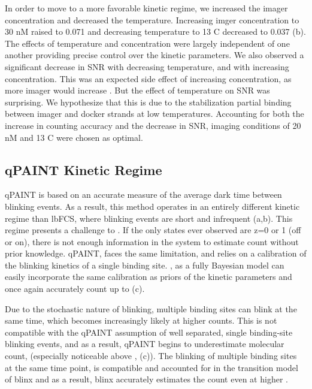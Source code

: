 In order to move to a more favorable kinetic regime, 
we increased the imager concentration and decreased the temperature.
	Increasing imger concentration to 30 nM raised \pon to 0.071 and 
	decreasing temperature to 13 C decreased \poff to 0.037 
	(b).
	The effects of temperature and concentration were largely independent 
	of one another providing precise control over the kinetic parameters. %
	We also observed a significant decrease in SNR with decreasing temperature, 
	and with increasing concentration. 
	This was an expected side effect of increasing concentration, as more imager would increase \rb.
	But the effect of temperature on SNR was surprising. 
	We hypothesize that this is due to the stabilization partial 
	binding between imager and docker strands at low temperatures.
	Accounting for both the increase in counting accuracy and the decrease 
	in SNR, imaging conditions of 20 nM and 13 C were chosen as optimal.

\subsection{qPAINT Kinetic Regime}
qPAINT is based on an accurate measure of the average dark time between blinking events. 
	As a result, this method operates in an entirely different kinetic regime than lbFCS, where blinking 
	events are short and infrequent (a,b).
	This regime presents a challenge to \ours. 
	If the only states ever observed are z=0 or 1 (off or on), there is not enough information in the system to estimate count without prior knowledge.
	qPAINT, faces the same limitation, and relies on a calibration of the blinking kinetics of a single binding site.
	\ours, as a fully Bayesian model can easily incorporate the same calibration as priors of the kinetic parameters
	and once again accurately count up to  (c).

Due to the stochastic nature of blinking, multiple binding sites can blink at the same time, which becomes increasingly likely at higher counts.
	This is not compatible with the qPAINT assumption of well separated, single binding-site blinking events, 
	and as a result, qPAINT begins to underestimate molecular count, (especially noticeable above , (c)). 
	The blinking of multiple binding sites at the same time point, 
	is compatible and accounted for in the transition model of blinx 
	and as a result, blinx accurately estimates the count even at higher \n.
	

